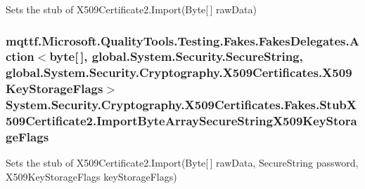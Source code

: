 Sets the stub of X509\-Certificate2.\-Import(\-Byte\mbox{[}$\,$\mbox{]} raw\-Data)

\hypertarget{class_system_1_1_security_1_1_cryptography_1_1_x509_certificates_1_1_fakes_1_1_stub_x509_certificate2_a813e8a048414222a2ba927a0458cab09}{
\subsubsection[{Import\-Byte\-Array\-Secure\-String\-X509\-Key\-Storage\-Flags}]{\setlength{\rightskip}{0pt plus 5cm}mqttf.\-Microsoft.\-Quality\-Tools.\-Testing.\-Fakes.\-Fakes\-Delegates.\-Action$<$byte\mbox{[}$\,$\mbox{]}, global.\-System.\-Security.\-Secure\-String, global.\-System.\-Security.\-Cryptography.\-X509\-Certificates.\-X509\-Key\-Storage\-Flags$>$ System.\-Security.\-Cryptography.\-X509\-Certificates.\-Fakes.\-Stub\-X509\-Certificate2.\-Import\-Byte\-Array\-Secure\-String\-X509\-Key\-Storage\-Flags}}\label{class_system_1_1_security_1_1_cryptography_1_1_x509_certificates_1_1_fakes_1_1_stub_x509_certificate2_a813e8a048414222a2ba927a0458cab09}


Sets the stub of X509\-Certificate2.\-Import(\-Byte\mbox{[}$\,$\mbox{]} raw\-Data, Secure\-String password, X509\-Key\-Storage\-Flags key\-Storage\-Flags)


